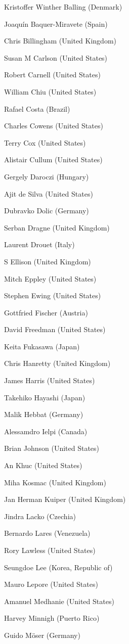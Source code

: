 Kristoffer Winther Balling (Denmark)

Joaquín Baquer-Miravete (Spain)

Chris Billingham (United Kingdom)

Susan M Carlson (United States)

Robert Carnell (United States)

William Chiu (United States)

Rafael Costa (Brazil)

Charles Cowens (United States)

Terry Cox (United States)

Alistair Cullum (United States)

Gergely Daroczi (Hungary)

Ajit de Silva (United States)

Dubravko Dolic (Germany)

Serban Dragne (United Kingdom)

Laurent Drouet (Italy)

S Ellison (United Kingdom)

Mitch Eppley (United States)

Stephen Ewing (United States)

Gottfried Fischer (Austria)

David Freedman (United States)

Keita Fukasawa (Japan)

Chris Hanretty (United Kingdom)

James Harris (United States)

Takehiko Hayashi (Japan)

Malik Hebbat (Germany)

Alessamdro Ielpi (Canada)

Brian Johnson (United States)

An Khuc (United States)

Miha Kosmac (United Kingdom)

Jan Herman Kuiper (United Kingdom)

Jindra Lacko (Czechia)

Bernardo Lares (Venezuela)

Rory Lawless (United States)

Seungdoe Lee (Korea, Republic of)

Mauro Lepore (United States)

Amanuel Medhanie (United States)

Harvey Minnigh (Puerto Rico)

Guido Möser (Germany)

